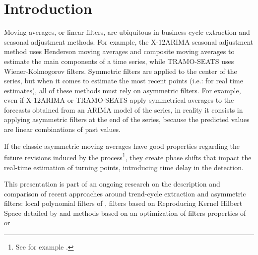 \documentclass[fleqn,10pt]{latex/stylish_article} %
\affiliation{
\textsuperscript{1}LEMNA\\ \hspace{1em} \\\textsuperscript{2}Independant\\ \hspace{1em} 
}
\affiliation{*\textbf{Corresponding author}: \href{mailto:alain.quartier@yahoo.fr}{\nolinkurl{alain.quartier@yahoo.fr}}, } %
\newcommand\1{\mathds{1}}
\begin{document}

\flushbottom %

\maketitle %

\tableofcontents %

\thispagestyle{empty} %


\hypertarget{introduction}{%
\section{Introduction}\label{introduction}}

Moving averages, or linear filters, are ubiquitous in business cycle extraction and seasonal adjustment methods.
For example, the X-12ARIMA seasonal adjustment method uses Henderson moving averages and composite moving averages to estimate the main components of a time series, while TRAMO-SEATS uses Wiener-Kolmogorov filters.
Symmetric filters are applied to the center of the series, but when it comes to estimate the most recent points (i.e.: for real time estimates), all of these methods must rely on asymmetric filters.
For example, even if X-12ARIMA or TRAMO-SEATS apply symmetrical averages to the forecasts obtained from an ARIMA model of the series, in reality it consists in applying asymmetric filters at the end of the series, because the predicted values are linear combinations of past values.

If the classic asymmetric moving averages have good properties regarding the future revisions induced by the process\footnote{See for example \citet{pierce1980SA}.}, they create phase shifts that impact the real-time estimation of turning points, introducing time delay in the detection.

This presentation is part of an ongoing research on the description and comparison of recent approaches around trend-cycle extraction and asymmetric filters: local polynomial filters of \citet{proietti2008}, filters based on Reproducing Kernel Hilbert Space detailed by \citet{dagumbianconcini2008} and methods based on an optimization of filters properties of \citet{ch15HBSA} or \citet{trilemmaWMR2019}
\end{document}
